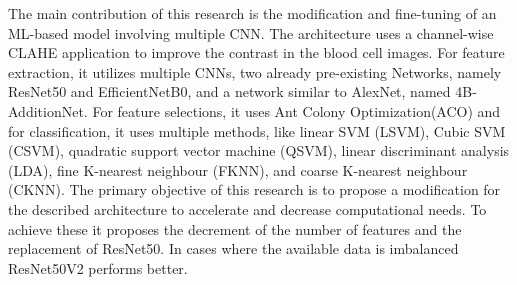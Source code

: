 The main contribution of this research is the modification and fine-tuning of an ML-based model involving multiple CNN. The architecture uses a channel-wise CLAHE application to improve the contrast in the blood cell images. For feature extraction, it utilizes multiple CNNs, two already pre-existing Networks, namely ResNet50 and EfficientNetB0, and a network similar to AlexNet, named 4B-AdditionNet. For feature selections, it uses Ant Colony Optimization(ACO) and for classification, it uses multiple methods, like linear SVM (LSVM), Cubic SVM (CSVM), quadratic support vector machine (QSVM), linear discriminant analysis (LDA), fine K-nearest neighbour (FKNN), and coarse K-nearest neighbour (CKNN).
The primary objective of this research is to propose a modification for the described architecture to accelerate and decrease computational needs. To achieve these it proposes the decrement of the number of features and the replacement of ResNet50. In cases where the available data is imbalanced ResNet50V2 performs better. %
 
